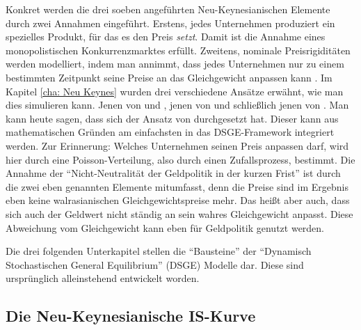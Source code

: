 Konkret werden die drei soeben angeführten Neu-Keynesianischen Elemente durch zwei Annahmen eingeführt. Erstens, jedes Unternehmen produziert ein spezielles Produkt, für das es den Preis \textit{setzt}. Damit ist die Annahme eines monopolistischen Konkurrenzmarktes erfüllt. Zweitens, nominale Preisrigiditäten werden modelliert, indem man annimmt, dass jedes Unternehmen nur zu einem bestimmten Zeitpunkt seine Preise an das Gleichgewicht anpassen kann \parencite[S. 52]{Gali2015}. Im Kapitel \ref{cha: Neu Keynes} wurden drei verschiedene Ansätze erwähnt, wie man dies simulieren kann. Jenen von \textcite{Fischer1977} und \textcite{Taylor1977}, jenen von \textcite{Taylor1979} und schließlich jenen von \textcite{Calvo1983}. Man kann heute sagen, dass sich der Ansatz von \textcite{Calvo1983} durchgesetzt hat. Dieser kann aus mathematischen Gründen am einfachsten in das DSGE-Framework integriert werden. Zur Erinnerung: Welches Unternehmen seinen Preis anpassen darf, wird hier durch eine Poisson-Verteilung, also durch einen Zufallsprozess, bestimmt. Die Annahme der "`Nicht-Neutralität der Geldpolitik in der kurzen Frist"' ist durch die zwei eben genannten Elemente mitumfasst, denn die Preise sind im Ergebnis eben keine walrasianischen Gleichgewichtspreise mehr. Das heißt aber auch, dass sich auch der Geldwert nicht ständig an sein wahres Gleichgewicht anpasst. Diese Abweichung vom Gleichgewicht kann eben für Geldpolitik genutzt werden.

Die drei folgenden Unterkapitel stellen die "`Bausteine"' der "`Dynamisch Stochastischen General Equilibrium"' (DSGE) Modelle dar. Diese sind ursprünglich alleinstehend entwickelt worden. 

\subsection{Die Neu-Keynesianische IS-Kurve}
\label{NeueIS}

